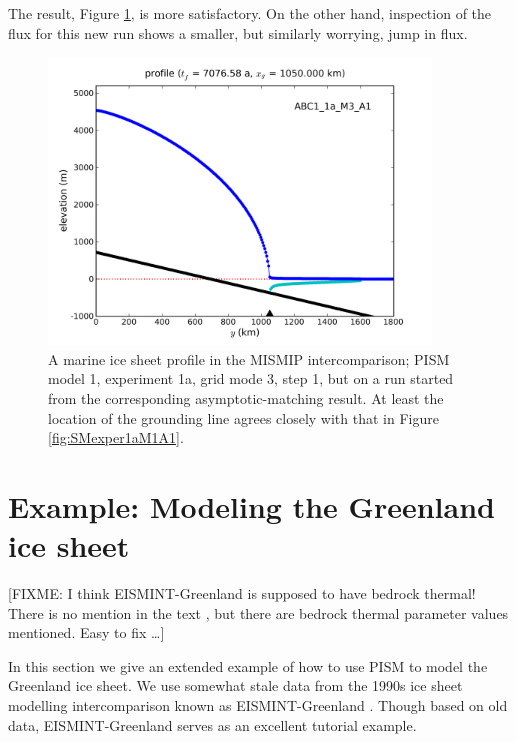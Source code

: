 \documentclass[11pt,final]{amsart}
\begin{document}
\noindent The result, Figure \ref{fig:MISMIPmodel1exper1aM3A1FROMSM}, is more satisfactory.  On the other hand, inspection of the flux for this new run shows a smaller, but similarly worrying, jump in flux.

\begin{figure}[ht]
\includegraphics[width=4.0in,keepaspectratio=true]{figs/profile_EBU1_1a_M3_A1}
\caption{A marine ice sheet profile in the MISMIP intercomparison; PISM model 1, experiment 1a, grid mode 3, step 1, but on a run started from the corresponding asymptotic-matching result.  At least the location of the grounding line agrees closely with that in Figure \ref{fig:SMexper1aM1A1}.}
\label{fig:MISMIPmodel1exper1aM3A1FROMSM}
\end{figure}


\clearpage\newpage

\section{Example: Modeling the Greenland ice sheet}\label{sect:green}  

[FIXME: I think EISMINT-Greenland is supposed to have bedrock thermal!  There is no mention in the text \cite{RitzEISMINT}, but there are bedrock thermal parameter values mentioned.  Easy to fix \dots]

In this section we give an extended example of how to use PISM to model the Greenland ice sheet.  We use somewhat stale data from the 1990s ice sheet modelling intercomparison known as EISMINT-Greenland \cite{HuybrechtsEISMINT,RitzEISMINT}.  Though based on old data, EISMINT-Greenland serves as an excellent tutorial example.
\end{document}
